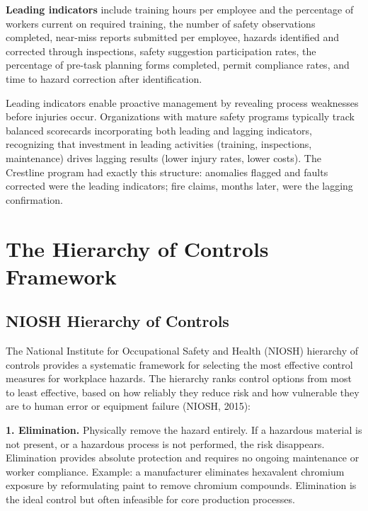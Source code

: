 \documentclass[11pt,openany]{book}
\begin{document}
\textbf{Leading indicators} include training hours per employee and the
percentage of workers current on required training, the number of safety
observations completed, near-miss reports submitted per employee, hazards
identified and corrected through inspections, safety suggestion participation
rates, the percentage of pre-task planning forms completed, permit compliance
rates, and time to hazard correction after identification.

Leading indicators enable proactive management by revealing process weaknesses
before injuries occur. Organizations with mature safety programs typically
track balanced scorecards incorporating both leading and lagging indicators,
recognizing that investment in leading activities (training, inspections,
maintenance) drives lagging results (lower injury rates, lower costs). The
Crestline program had exactly this structure: anomalies flagged and faults
corrected were the leading indicators; fire claims, months later, were the
lagging confirmation.

\section{The Hierarchy of Controls Framework}
\label{sec:hierarchy}

\subsection{NIOSH Hierarchy of Controls}

The National Institute for Occupational Safety and Health (NIOSH) hierarchy of
controls provides a systematic framework for selecting the most effective
control measures for workplace hazards. The hierarchy ranks control options
from most to least effective, based on how reliably they reduce risk and how
vulnerable they are to human error or equipment failure (NIOSH, 2015):

\textbf{1. Elimination.} Physically remove the hazard entirely. If a hazardous
material is not present, or a hazardous process is not performed, the risk
disappears. Elimination provides absolute protection and requires no ongoing
maintenance or worker compliance. Example: a manufacturer eliminates
hexavalent chromium exposure by reformulating paint to remove chromium
compounds. Elimination is the ideal control but often infeasible for core
production processes.
\end{document}
